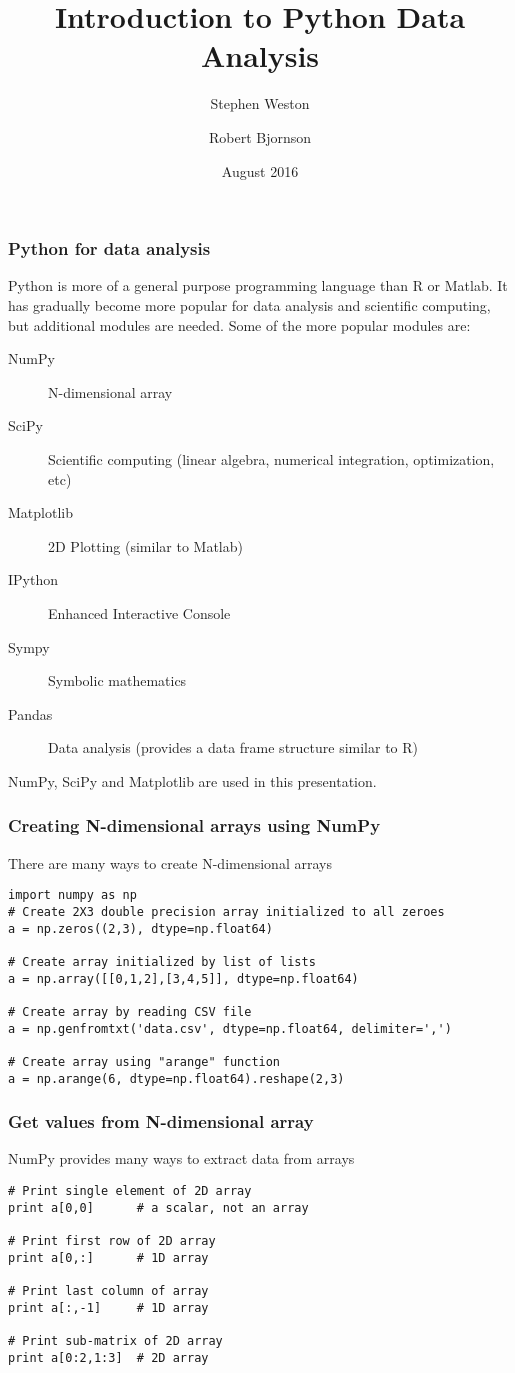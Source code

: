 \documentclass[10pt]{beamer}
\title{Introduction to Python Data Analysis}
\author{{Stephen Weston} \and {Robert Bjornson}}
\institute[Yale]{
  Yale Center for Research Computing \\
  Yale University
}
\date{August 2016}
\begin{document}
\begin{frame}[plain]
  \titlepage
\end{frame}

\begin{frame}
\frametitle{Python for data analysis}
Python is more of a general purpose programming language than
R or Matlab.
It has gradually become more popular for data analysis and
scientific computing, but additional modules are needed.
Some of the more popular modules are:
\begin{description}
\item[NumPy] N-dimensional array
\item[SciPy] Scientific computing (linear algebra, numerical integration, optimization, etc)
\item[Matplotlib] 2D Plotting (similar to Matlab)
\item[IPython] Enhanced Interactive Console
\item[Sympy] Symbolic mathematics
\item[Pandas] Data analysis (provides a data frame structure similar to R)
\end{description}
\vskip10pt
NumPy, SciPy and Matplotlib are used in this presentation.
\end{frame}

\begin{frame}[fragile]
\frametitle{Creating N-dimensional arrays using NumPy}
There are many ways to create N-dimensional arrays
\begin{verbatim}
import numpy as np
# Create 2X3 double precision array initialized to all zeroes
a = np.zeros((2,3), dtype=np.float64)

# Create array initialized by list of lists
a = np.array([[0,1,2],[3,4,5]], dtype=np.float64)

# Create array by reading CSV file
a = np.genfromtxt('data.csv', dtype=np.float64, delimiter=',')

# Create array using "arange" function
a = np.arange(6, dtype=np.float64).reshape(2,3)
\end{verbatim}
\end{frame}

\begin{frame}[fragile]
\frametitle{Get values from N-dimensional array}
NumPy provides many ways to extract data from arrays
\begin{verbatim}
# Print single element of 2D array
print a[0,0]      # a scalar, not an array

# Print first row of 2D array
print a[0,:]      # 1D array

# Print last column of array
print a[:,-1]     # 1D array

# Print sub-matrix of 2D array
print a[0:2,1:3]  # 2D array

\end{verbatim}
\end{frame}
\end{document}

